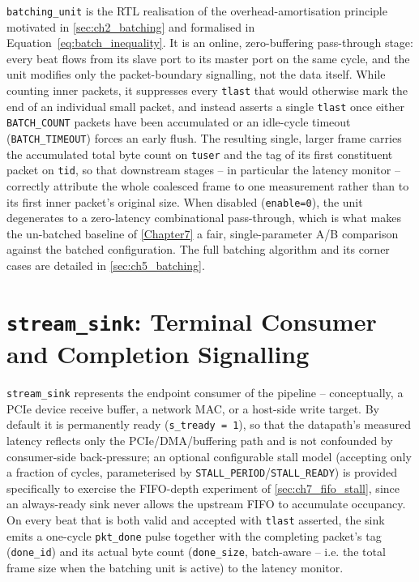 \texttt{batching\_unit} is the RTL realisation of the overhead-amortisation principle motivated in \autoref{sec:ch2_batching} and formalised in Equation~\ref{eq:batch_inequality}. It is an online, zero-buffering pass-through stage: every beat flows from its slave port to its master port on the same cycle, and the unit modifies only the packet-boundary signalling, not the data itself. While counting inner packets, it suppresses every \texttt{tlast} that would otherwise mark the end of an individual small packet, and instead asserts a single \texttt{tlast} once either \texttt{BATCH\_COUNT} packets have been accumulated or an idle-cycle timeout (\texttt{BATCH\_TIMEOUT}) forces an early flush. The resulting single, larger frame carries the accumulated total byte count on \texttt{tuser} and the tag of its first constituent packet on \texttt{tid}, so that downstream stages -- in particular the latency monitor -- correctly attribute the whole coalesced frame to one measurement rather than to its first inner packet's original size. When disabled (\texttt{enable=0}), the unit degenerates to a zero-latency combinational pass-through, which is what makes the un-batched baseline of \autoref{Chapter7} a fair, single-parameter A/B comparison against the batched configuration. The full batching algorithm and its corner cases are detailed in \autoref{sec:ch5_batching}.

\section{\texttt{stream\_sink}: Terminal Consumer and Completion Signalling}
\label{sec:ch4_stream_sink}

\texttt{stream\_sink} represents the endpoint consumer of the pipeline -- conceptually, a PCIe device receive buffer, a network MAC, or a host-side write target. By default it is permanently ready (\texttt{s\_tready = 1}), so that the datapath's measured latency reflects only the PCIe/DMA/buffering path and is not confounded by consumer-side back-pressure; an optional configurable stall model (accepting only a fraction of cycles, parameterised by \texttt{STALL\_PERIOD}/\texttt{STALL\_READY}) is provided specifically to exercise the FIFO-depth experiment of \autoref{sec:ch7_fifo_stall}, since an always-ready sink never allows the upstream FIFO to accumulate occupancy. On every beat that is both valid and accepted with \texttt{tlast} asserted, the sink emits a one-cycle \texttt{pkt\_done} pulse together with the completing packet's tag (\texttt{done\_id}) and its actual byte count (\texttt{done\_size}, batch-aware -- i.e. the total frame size when the batching unit is active) to the latency monitor.

